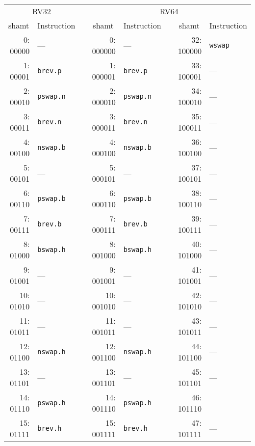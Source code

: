 \begin{table}[h]
\begin{small}
\begin{center}
\begin{tabular}{r l p{0.5in} r l p{0.3in} r l}

\multicolumn{2}{c}{RV32} & &
\multicolumn{5}{c}{RV64} \\

\cline{1-2}
\cline{4-8}

\multicolumn{1}{c}{shamt} & Instruction & &
\multicolumn{1}{c}{shamt} & Instruction & &
\multicolumn{1}{c}{shamt} & Instruction \\

\cline{1-2}
\cline{4-5}
\cline{7-8}

 0: 00000 & ---           &   &  0: 000000 & ---           &   & 32: 100000 & {\tt wswap} \\
 1: 00001 & {\tt brev.p}  &   &  1: 000001 & {\tt brev.p}  &   & 33: 100001 & ---         \\
 2: 00010 & {\tt pswap.n} &   &  2: 000010 & {\tt pswap.n} &   & 34: 100010 & ---         \\
 3: 00011 & {\tt brev.n}  &   &  3: 000011 & {\tt brev.n}  &   & 35: 100011 & ---         \\
 4: 00100 & {\tt nswap.b} &   &  4: 000100 & {\tt nswap.b} &   & 36: 100100 & ---         \\
 5: 00101 & ---           &   &  5: 000101 & ---           &   & 37: 100101 & ---         \\
 6: 00110 & {\tt pswap.b} &   &  6: 000110 & {\tt pswap.b} &   & 38: 100110 & ---         \\
 7: 00111 & {\tt brev.b}  &   &  7: 000111 & {\tt brev.b}  &   & 39: 100111 & ---         \\

\cline{1-2}
\cline{4-5}
\cline{7-8}

 8: 01000 & {\tt bswap.h} &   &  8: 001000 & {\tt bswap.h} &   & 40: 101000 & ---         \\
 9: 01001 & ---           &   &  9: 001001 & ---           &   & 41: 101001 & ---         \\
10: 01010 & ---           &   & 10: 001010 & ---           &   & 42: 101010 & ---         \\
11: 01011 & ---           &   & 11: 001011 & ---           &   & 43: 101011 & ---         \\
12: 01100 & {\tt nswap.h} &   & 12: 001100 & {\tt nswap.h} &   & 44: 101100 & ---         \\
13: 01101 & ---           &   & 13: 001101 & ---           &   & 45: 101101 & ---         \\
14: 01110 & {\tt pswap.h} &   & 14: 001110 & {\tt pswap.h} &   & 46: 101110 & ---         \\
15: 01111 & {\tt brev.h}  &   & 15: 001111 & {\tt brev.h}  &   & 47: 101111 & ---         \\


\end{tabular}
\end{center}
\end{small}
\end{table}
